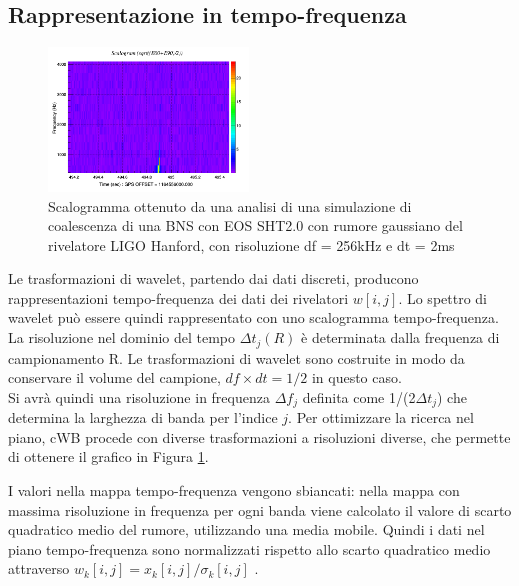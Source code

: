 \subsection{Rappresentazione in tempo-frequenza}
\begin{figure}
	\vspace{-20pt}
	\begin{center}
		\includegraphics[width=0.475\textwidth]{figures/Capitolo_2/L1_scalogram_0.png}
	\end{center}
	\vspace{-5pt}
	\caption{Scalogramma ottenuto da una analisi di una simulazione di coalescenza di una BNS con EOS SHT2.0 con rumore gaussiano del rivelatore LIGO Hanford, con risoluzione df = 256kHz e dt = 2ms}
	\label{fig:scalogram_example}
	\vspace{-15pt}
\end{figure}
\label{subsection:wavelet_transform}
Le trasformazioni di wavelet, partendo dai dati discreti, producono rappresentazioni tempo-frequenza dei dati dei rivelatori $w[i,j]$. Lo spettro di wavelet può essere quindi rappresentato con uno scalogramma tempo-frequenza. La risoluzione nel dominio del tempo $\Delta t_j(R)$ è determinata dalla frequenza di campionamento R. Le trasformazioni di wavelet sono costruite in modo da conservare il volume del campione, $df\times dt=1/2$ in questo caso.\\
Si avrà quindi una risoluzione in frequenza $\Delta f_j$ definita come 1/(2$\Delta t_j$) che determina la larghezza di banda per l'indice $j$. Per ottimizzare la ricerca nel piano, cWB procede con diverse trasformazioni a risoluzioni diverse, che permette di ottenere il grafico in Figura \ref{fig:scalogram_example}\cite{Klimenko_2008}.

I valori nella mappa tempo-frequenza vengono sbiancati: nella mappa con massima risoluzione in frequenza per ogni banda viene calcolato il valore di scarto quadratico medio del rumore, utilizzando una media mobile. Quindi i dati nel piano tempo-frequenza sono normalizzati rispetto allo scarto quadratico medio attraverso $w_k[i,j] = x_k[i,j]/\sigma_k[i,j]$ \cite{Klimenko_2016}.

